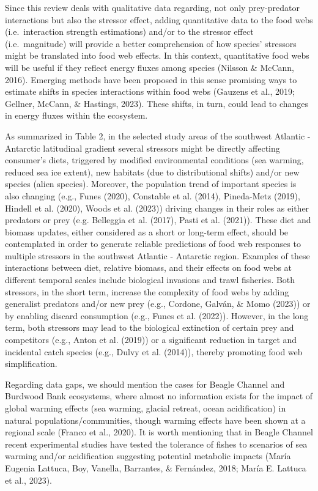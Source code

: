\documentclass[
]{article}
\begin{document}
Since this review deals with qualitative data regarding, not only
prey-predator interactions but also the stressor effect, adding
quantitative data to the food webs (i.e.~interaction strength
estimations) and/or to the stressor effect (i.e.~magnitude) will provide
a better comprehension of how species' stressors might be translated
into food web effects. In this context, quantitative food webs will be
useful if they reflect energy fluxes among species (Nilsson \& McCann,
2016). Emerging methods have been proposed in this sense promising ways
to estimate shifts in species interactions within food webs (Gauzens et
al., 2019; Gellner, McCann, \& Hastings, 2023). These shifts, in turn,
could lead to changes in energy fluxes within the ecosystem.

As summarized in Table 2, in the selected study areas of the southwest
Atlantic - Antarctic latitudinal gradient several stressors might be
directly affecting consumer's diets, triggered by modified environmental
conditions (sea warming, reduced sea ice extent), new habitats (due to
distributional shifts) and/or new species (alien species). Moreover, the
population trend of important species is also changing (e.g., Funes
(2020), Constable et al. (2014), Pineda-Metz (2019), Hindell et al.
(2020), Woods et al. (2023)) driving changes in their roles as either
predators or prey (e.g. Belleggia et al. (2017), Pasti et al. (2021)).
These diet and biomass updates, either considered as a short or
long-term effect, should be contemplated in order to generate reliable
predictions of food web responses to multiple stressors in the southwest
Atlantic - Antarctic region. Examples of these interactions between
diet, relative biomass, and their effects on food webs at different
temporal scales include biological invasions and trawl fisheries. Both
stressors, in the short term, increase the complexity of food webs by
adding generalist predators and/or new prey (e.g., Cordone, Galván, \&
Momo (2023)) or by enabling discard consumption (e.g., Funes et al.
(2022)). However, in the long term, both stressors may lead to the
biological extinction of certain prey and competitors (e.g., Anton et
al. (2019)) or a significant reduction in target and incidental catch
species (e.g., Dulvy et al. (2014)), thereby promoting food web
simplification.

Regarding data gaps, we should mention the cases for Beagle Channel and
Burdwood Bank ecosystems, where almost no information exists for the
impact of global warming effects (sea warming, glacial retreat, ocean
acidification) in natural populations/communities, though warming
effects have been shown at a regional scale (Franco et al., 2020). It is
worth mentioning that in Beagle Channel recent experimental studies have
tested the tolerance of fishes to scenarios of sea warming and/or
acidification suggesting potential metabolic impacts (María Eugenia
Lattuca, Boy, Vanella, Barrantes, \& Fernández, 2018; María E. Lattuca
et al., 2023).
\end{document}
